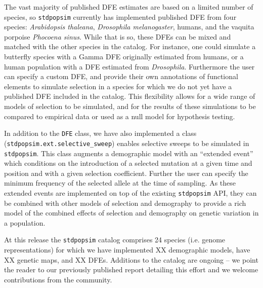 \documentclass[hidelinks]{article}
\newcommand{\stdpopsim}{\texttt{stdpopsim}\xspace}
\begin{document}
    The vast majority of published DFE estimates are based on a limited number of species,
    so \stdpopsim currently has implemented published DFE from
    four species: \textit{Arabidopsis thaleana}, \textit{Drosophila melanogaster},
    humans, and the vaquita porpoise \textit{Phocoena sinus}.
    While that is so, these DFEs can be mixed and matched with the other species
    in the catalog. For instance, one could simulate a butterfly species with a Gamma DFE originally
    estimated from humans, or a human population with a DFE estimated from \textit{Drosophila}.
    Furthermore the user can specify a custom DFE, and provide their own annotations
    of functional elements to simulate selection in a species for which we do not yet have 
    a published DFE included in the catalog. This flexibility allows for a wide range of
    models of selection to be simulated, and for the results of these simulations to be
    compared to empirical data or used as a null model for hypothesis testing.

    In addition to the \texttt{DFE} class, we have also implemented a class (\texttt{stdpopsim.ext.selective\_sweep})
    enables selective sweeps to be simulated in \stdpopsim.
    This class augments a demographic model with an ``extended event''
    which conditions on the introduction of a selected mutation at a given time and position
    and with a given selection coefficient. Further the user can specify the minimum frequency
    of the selected allele at the time of sampling. As these extended events are implemented
    on top of the existing \stdpopsim API, they can be combined with other models of selection
    and demography to provide a rich model of the combined effects of selection and demography
    on genetic variation in a population.

    At this release the \stdpopsim catalog comprises 24 species (i.e. genome representations)
    for which we have implemented XX demographic models, have XX genetic maps, and XX DFEs.
    Additions to the catalog are ongoing -- we point the reader to our previously published 
    report detailing this effort \citep{lauterbur2023expanding} and we welcome contributions from the community.
\end{document}
